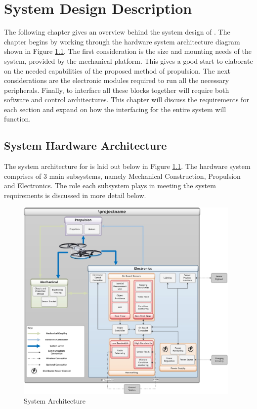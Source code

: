 \chapter{System Design Description}
The following chapter gives an overview behind the system design of \projectName. The chapter begins by working through the hardware system architecture diagram shown in Figure \ref{IM_SystemArchitecture}. The first consideration is the size and mounting needs of the system, provided by the mechanical platform. This gives a good start to elaborate on the needed capabilities of the proposed method of propulsion. The next considerations are the electronic modules required to run all the necessary peripherals. Finally, to interface all these blocks together will require both software and control architectures. This chapter will discuss the requirements for each section and expand on how the interfacing for the entire system will function.

	\section{System Hardware Architecture}
	The system architecture for \projectName is laid out below in Figure \ref{IM_SystemArchitecture}. The hardware system comprises of 3 main subsystems, namely Mechanical Construction, Propulsion and Electronics. The role each subsystem plays in meeting the system requirements is discussed in more detail below.
	
	\begin{figure}[H]
		\centering
		\includegraphics[height = 10cm]{../Design/System/SystemArchitecture/SystemArchitecture.jpg}
		\caption{System Architecture}
		\label{IM_SystemArchitecture}
	\end{figure}
		
